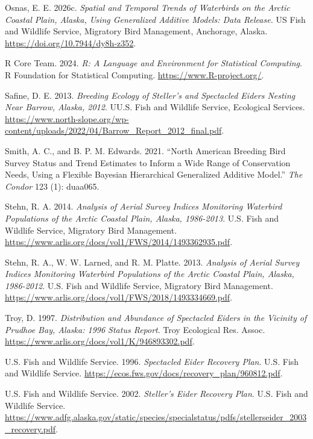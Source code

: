 \documentclass[
]{article}
\newlength{\cslhangindent}
\newenvironment{CSLReferences}[2] %
 {\begin{list}{}{%
  \setlength{\itemindent}{0pt}
  \setlength{\leftmargin}{0pt}
  \setlength{\parsep}{0pt}
  \ifodd #1
   \setlength{\leftmargin}{\cslhangindent}
   \setlength{\itemindent}{-1\cslhangindent}
  \fi
  \setlength{\itemsep}{#2\baselineskip}}}
 {\end{list}}
\begin{document}
\begin{CSLReferences}{1}{1}
Osnas, E. E. 2026c. \emph{Spatial and Temporal Trends of Waterbirds on
the Arctic Coastal Plain, Alaska, Using Generalized Additive Models:
Data Release.} {US Fish and Wildlife Service, Migratory Bird Management,
Anchorage, Alaska}. \url{https://doi.org/10.7944/dy8h-z352}.

R Core Team. 2024. \emph{R: A Language and Environment for Statistical
Computing}. R Foundation for Statistical Computing.
\url{https://www.R-project.org/}.

Safine, D. E. 2013. \emph{Breeding Ecology of Steller's and Spectacled
Eiders Nesting Near Barrow, Alaska, 2012}. U{U.S. Fish and Wildlife
Service}, {Ecological Services}.
\url{https://www.north-slope.org/wp-content/uploads/2022/04/Barrow_Report_2012_final.pdf}.

Smith, A. C., and B. P. M. Edwards. 2021. {``North American Breeding
Bird Survey Status and Trend Estimates to Inform a Wide Range of
Conservation Needs, Using a Flexible Bayesian Hierarchical Generalized
Additive Model.''} \emph{The Condor} 123 (1): duaa065.

Stehn, R. A. 2014. \emph{Analysis of Aerial Survey Indices Monitoring
Waterbird Populations of the Arctic Coastal Plain, Alaska, 1986-2013}.
{U.S. Fish and Wildlife Service}, {Migratory Bird Management}.
\url{https://www.arlis.org/docs/vol1/FWS/2014/1493362935.pdf}.

Stehn, R. A., W. W. Larned, and R. M. Platte. 2013. \emph{Analysis of
Aerial Survey Indices Monitoring Waterbird Populations of the Arctic
Coastal Plain, Alaska, 1986-2012}. {U.S. Fish and Wildlife Service},
{Migratory Bird Management}.
\url{https://www.arlis.org/docs/vol1/FWS/2018/1493334669.pdf}.

Troy, D. 1997. \emph{Distribution and Abundance of Spectacled Eiders in
the Vicinity of Prudhoe Bay, Alaska: 1996 Status Report}. Troy
Ecological Res. Assoc.
\url{https://www.arlis.org/docs/vol1/K/946893302.pdf}.

U.S. Fish and Wildlife Service. 1996. \emph{Spectacled Eider Recovery
Plan}. {U.S. Fish and Wildlife Service}.
\url{https://ecos.fws.gov/docs/recovery_plan/960812.pdf}.

U.S. Fish and Wildlife Service. 2002. \emph{Steller's Eider Recovery
Plan}. {U.S. Fish and Wildlife Service}.
\url{https://www.adfg.alaska.gov/static/species/specialstatus/pdfs/stellerseider_2003_recovery.pdf}.


\end{CSLReferences}
\end{document}

